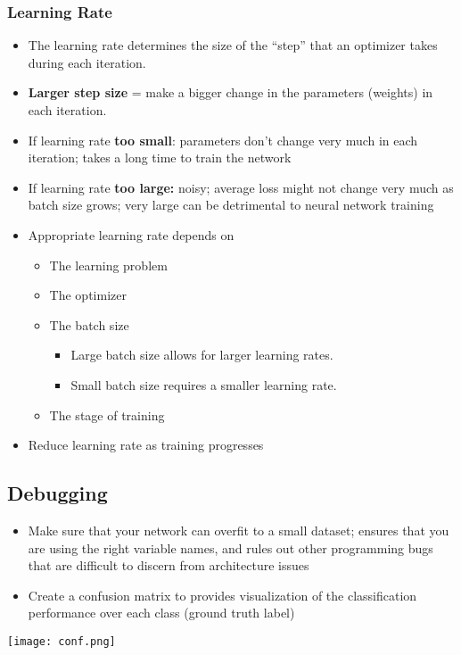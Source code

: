 \documentclass[11pt]{article}
\begin{document}
\subsubsection{Learning Rate}
\begin{itemize}
\item The learning rate determines the size of the “step” that an optimizer takes during each iteration.
\item \textbf{Larger step size} = make a bigger change in the parameters (weights) in each iteration.
\item If learning rate \textbf{too small}: parameters don’t change
very much in each iteration; takes a long time to train the network
\item If learning rate \textbf{too large:} noisy; average loss might not change very much as batch size grows; very large can be detrimental to neural network training
\item Appropriate learning rate depends on 
\begin{itemize}
\item The learning problem
\item The optimizer
\item The batch size
\begin{itemize}
\item Large batch size allows for larger learning rates. 
\item Small batch size requires a smaller learning rate.
\end{itemize} 
\item The stage of training
\end{itemize}
\item Reduce learning rate as training progresses
\end{itemize}

\subsection{Debugging}
\begin{itemize}
\item Make sure that your network can overfit to a small dataset; ensures that you are using the right variable names, and rules out other programming bugs that are difficult to discern from architecture issues
\item Create a confusion matrix to provides visualization of the classification performance over each class (ground truth label)
\end{itemize}
\begin{center}
\texttt{[image: conf.png]}
\end{center}
\end{document}
